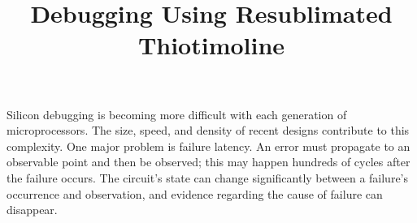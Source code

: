 \documentclass[a4paper, 12pt, onepage]{article}
\begin{document}
\title{Debugging Using Resublimated Thiotimoline}
\maketitle

Silicon debugging is becoming more difficult with each generation of microprocessors.
The size, speed, and density of recent designs contribute to this complexity.
One major problem is failure latency. An error must propagate to an observable
point and then be observed; this may happen hundreds of cycles after the failure
occurs. The circuit's state can change significantly between a failure's occurrence
and observation, and evidence regarding the cause of failure can disappear.
\end{document}
